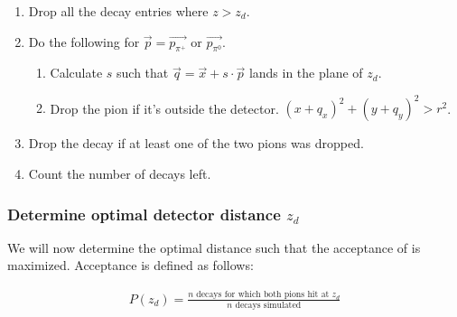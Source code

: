 \documentclass[12pt,a4paper,oneside,english]{article}
\begin{document}
		\begin{enumerate}
			\item Drop all the decay entries where $z > z_d$.
			\item Do the following for $\overrightarrow{p} = \overrightarrow{p_{\pi^+}}$ or $\overrightarrow{p_{\pi^0}}$.
			\begin{enumerate}
				\item Calculate $s$ such that $\overrightarrow{q} = \overrightarrow{x} + s \cdot \overrightarrow{p}$ lands in the plane of $z_d$.
				\item Drop the pion if it's outside the detector. $ (x + q_x)^2 + (y + q_y)^2 > r^2$. %
			\end{enumerate}
			\item Drop the decay if at least one of the two pions was dropped.
			\item Count the number of decays left. %
		\end{enumerate}
	
%
	
%		
%		
%		
%		

	
\subsubsection{Determine optimal detector distance $z_d$}
\label{optimal detector distance}
	We will now determine the optimal distance such that the acceptance of is maximized. Acceptance is defined as follows:
	
	\begin{align}
		P(z_d) = \frac{\text{$n$ decays for which both pions hit at $z_d$}}{\text{$n$ decays simulated}} 
	\end{align}
	
\end{document}
